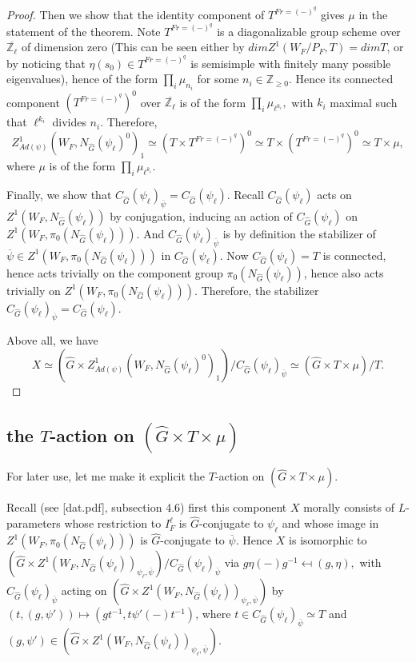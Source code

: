 \documentclass{article}
\begin{document}
\begin{proof}
		Then we show that the identity component of $T^{Fr=(-)^q}$ gives $\mu$ in the statement of the theorem. Note $T^{Fr=(-)^q}$ is a diagonalizable group scheme over $\overline{\mathbb{Z}_\ell}$ of dimension zero (This can be seen either by $dimZ^1(W_F/P_F, T)=dimT$, or by noticing that $\eta(s_0) \in T^{Fr=(-)^q}$ is semisimple with finitely many possible eigenvalues), hence of the form $\prod_i\mu_{n_i}$ for some $n_i \in \mathbb{Z}_{\geq 0}$. Hence its connected component $(T^{Fr=(-)^q})^0$ over $\overline{\mathbb{Z}_{\ell}}$ is of the form $\prod_i\mu_{\ell^{k_i}},$ with $k_i$ maximal such that $\ell^{k_i}$ divides $n_i$. Therefore, 
		$$Z^1_{Ad(\psi)}(W_F, N_{\hat{G}}(\psi_{\ell})^0)_1 \simeq (T \times T^{Fr=(-)^q})^0 \simeq T \times (T^{Fr=(-)^q})^0 \simeq T \times \mu,$$
		where $\mu$ is of the form $\prod_i\mu_{\ell^{k_i}}$.
		
		Finally, we show that $C_{\hat{G}}(\psi_{\ell})_{\overline{\psi}}=C_{\hat{G}}(\psi_{\ell})$. Recall $C_{\hat{G}}(\psi_{\ell})$ acts on $Z^1(W_F, N_{\hat{G}}(\psi_{\ell}))$ by conjugation, inducing an action of $C_{\hat{G}}(\psi_{\ell})$ on $Z^1(W_F, \pi_0(N_{\hat{G}}(\psi_{\ell}))).$ And $C_{\hat{G}}(\psi_{\ell})_{\overline{\psi}}$ is by definition the stabilizer of $\overline{\psi} \in Z^1(W_F, \pi_0(N_{\hat{G}}(\psi_{\ell})))$ in $C_{\hat{G}}(\psi_{\ell})$. Now $C_{\hat{G}}(\psi_{\ell})=T$ is connected, hence acts trivially on the component group $\pi_0(N_{\hat{G}}(\psi_{\ell}))$, hence also acts trivially on $Z^1(W_F, \pi_0(N_{\hat{G}}(\psi_{\ell})))$. Therefore, the stabilizer $C_{\hat{G}}(\psi_{\ell})_{\overline{\psi}}=C_{\hat{G}}(\psi_{\ell})$.
		
		Above all, we have 
		$$X \simeq (\hat{G} \times Z^1_{Ad(\psi)}(W_F, N_{\hat{G}}(\psi_{\ell})^0)_1)/C_{\hat{G}}(\psi_{\ell})_{\overline{\psi}} \simeq (\hat{G} \times T \times \mu)/T.$$
		
	\end{proof}
	
	\subsection{the $T$-action on $(\hat{G} \times T \times \mu)$}
	
	For later use, let me make it explicit the $T$-action on $(\hat{G} \times T \times \mu)$.
	
	Recall (see [dat.pdf], subsection 4.6) first this component $X$ morally consists of $L$-parameters whose restriction to $I_F^\ell$ is $\hat{G}$-conjugate to $\psi_{\ell}$ and whose image in $Z^1(W_F, \pi_0(N_{\hat{G}}(\psi_{\ell})))$ is $\hat{G}$-conjugate to $\overline{\psi}$. Hence $X$ is isomorphic to $(\hat{G} \times Z^1(W_F, N_{\hat{G}}(\psi_{\ell}))_{\psi_{\ell}, \overline{\psi}})/C_{\hat{G}}(\psi_{\ell})_{\overline{\psi}}$ via $g\eta(-)g^{-1} \mapsfrom (g, \eta),$ with $C_{\hat{G}}(\psi_{\ell})_{\overline{\psi}}$ acting on $(\hat{G} \times Z^1(W_F, N_{\hat{G}}(\psi_{\ell}))_{\psi_{\ell}, \overline{\psi}})$ by $(t, (g, \psi')) \mapsto (gt^{-1}, t\psi'(-)t^{-1})$, where $t \in C_{\hat{G}}(\psi_{\ell})_{\overline{\psi}} \simeq T$ and $(g, \psi') \in (\hat{G} \times Z^1(W_F, N_{\hat{G}}(\psi_{\ell}))_{\psi_{\ell}, \overline{\psi}})$.
	
\end{document}
